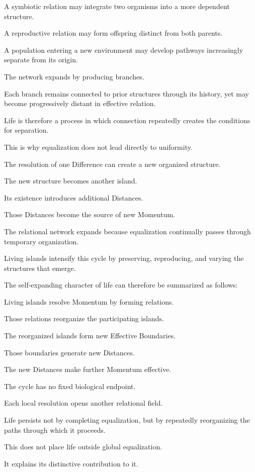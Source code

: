 A symbiotic relation may integrate two organisms into a more dependent structure.

A reproductive relation may form offspring distinct from both parents.

A population entering a new environment may develop pathways increasingly separate from its origin.

The network expands by producing branches.

Each branch remains connected to prior structures through its history, yet may become progressively distant in effective relation.

Life is therefore a process in which connection repeatedly creates the conditions for separation.

This is why equalization does not lead directly to uniformity.

The resolution of one Difference can create a new organized structure.

The new structure becomes another island.

Its existence introduces additional Distances.

Those Distances become the source of new Momentum.

The relational network expands because equalization continually passes through temporary organization.

Living islands intensify this cycle by preserving, reproducing, and varying the structures that emerge.

The self-expanding character of life can therefore be summarized as follows:

Living islands resolve Momentum by forming relations.

Those relations reorganize the participating islands.

The reorganized islands form new Effective Boundaries.

Those boundaries generate new Distances.

The new Distances make further Momentum effective.

The cycle has no fixed biological endpoint.

Each local resolution opens another relational field.

Life persists not by completing equalization, but by repeatedly reorganizing the paths through which it proceeds.

This does not place life outside global equalization.

It explains its distinctive contribution to it.

